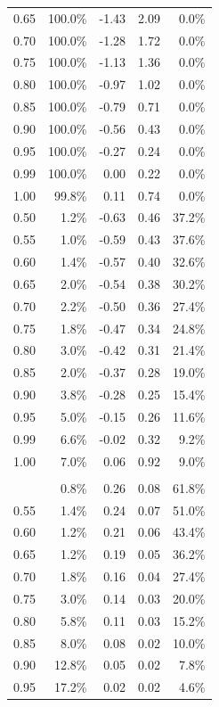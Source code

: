 \documentclass[
  letterpaper,
  DIV=11,
  numbers=noendperiod]{scrartcl}
\begin{document}
\begin{table}
{\begin{tabular*}{\linewidth}{@{\extracolsep{\fill}}rrrrr}
0.65 & 100.0\% & -1.43 & 2.09 & 0.0\% \\ 
0.70 & 100.0\% & -1.28 & 1.72 & 0.0\% \\ 
0.75 & 100.0\% & -1.13 & 1.36 & 0.0\% \\ 
0.80 & 100.0\% & -0.97 & 1.02 & 0.0\% \\ 
0.85 & 100.0\% & -0.79 & 0.71 & 0.0\% \\ 
0.90 & 100.0\% & -0.56 & 0.43 & 0.0\% \\ 
0.95 & 100.0\% & -0.27 & 0.24 & 0.0\% \\ 
0.99 & 100.0\% & 0.00 & 0.22 & 0.0\% \\ 
1.00 & 99.8\% & 0.11 & 0.74 & 0.0\% \\ 
0.50 & 1.2\% & -0.63 & 0.46 & 37.2\% \\ 
0.55 & 1.0\% & -0.59 & 0.43 & 37.6\% \\ 
0.60 & 1.4\% & -0.57 & 0.40 & 32.6\% \\ 
0.65 & 2.0\% & -0.54 & 0.38 & 30.2\% \\ 
0.70 & 2.2\% & -0.50 & 0.36 & 27.4\% \\ 
0.75 & 1.8\% & -0.47 & 0.34 & 24.8\% \\ 
0.80 & 3.0\% & -0.42 & 0.31 & 21.4\% \\ 
0.85 & 2.0\% & -0.37 & 0.28 & 19.0\% \\ 
0.90 & 3.8\% & -0.28 & 0.25 & 15.4\% \\ 
0.95 & 5.0\% & -0.15 & 0.26 & 11.6\% \\ 
0.99 & 6.6\% & -0.02 & 0.32 & 9.2\% \\ 
1.00 & 7.0\% & 0.06 & 0.92 & 9.0\% \\ 
\midrule\addlinespace[2.5pt]
\multicolumn{5}{l}{C} \\[2.5pt] 
\midrule\addlinespace[2.5pt]
0.50 & 0.8\% & 0.26 & 0.08 & 61.8\% \\ 
0.55 & 1.4\% & 0.24 & 0.07 & 51.0\% \\ 
0.60 & 1.2\% & 0.21 & 0.06 & 43.4\% \\ 
0.65 & 1.2\% & 0.19 & 0.05 & 36.2\% \\ 
0.70 & 1.8\% & 0.16 & 0.04 & 27.4\% \\ 
0.75 & 3.0\% & 0.14 & 0.03 & 20.0\% \\ 
0.80 & 5.8\% & 0.11 & 0.03 & 15.2\% \\ 
0.85 & 8.0\% & 0.08 & 0.02 & 10.0\% \\ 
0.90 & 12.8\% & 0.05 & 0.02 & 7.8\% \\ 
0.95 & 17.2\% & 0.02 & 0.02 & 4.6\% \\ 

\end{tabular*}}
\end{table}
\end{document}
